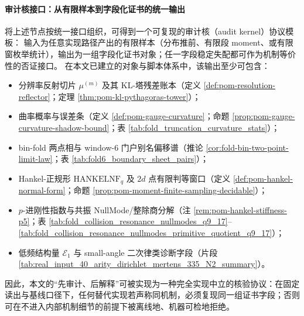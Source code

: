 \paragraph{审计核接口：从有限样本到字段化证书的统一输出}
将上述节点按统一接口组织，可得到一个可复现的审计核（audit kernel）协议模板：
输入为任意实现路径产出的有限样本（分布推前、有限段 moment、或有限窗枚举统计），输出为一组字段化证书对象；任一字段稳定失配都可作为机制等价性的否证接口。
在本文已建立的对象与脚本体系中，该输出至少可包含：
\begin{itemize}
  \item 分辨率反射切片 \(\mu^{(m)}\) 及其 KL-塔残差账本（定义 \ref{def:pom-resolution-reflector}；定理 \ref{thm:pom-kl-pythagoras-tower}）；
  \item 曲率概率与误差条（定义 \ref{def:pom-gauge-curvature}；命题 \ref{prop:pom-gauge-curvature-shadow-bound}；表 \ref{tab:fold_truncation_curvature_stats}）；
  \item bin-fold 两点相与 window-\(6\) 门户别名偏移谱（推论 \ref{cor:fold-bin-two-point-limit-law}；表 \ref{tab:fold6_boundary_sheet_pairs}）；
  \item Hankel-正规形 \(\mathrm{HANKELNF}_q\) 及 \(2d\) 点有限判等窗口（定义 \ref{def:pom-hankel-normal-form}；命题 \ref{prop:pom-moment-finite-sampling-decidable}）；
  \item \(p\)-进刚性指数与共振 NullMode/整除商分解（注 \ref{rem:pom-hankel-stiffness-p5}；表 \ref{tab:fold_collision_resonance_nullmodes_q9_17}--\ref{tab:fold_collision_resonance_nullmodes_primitive_quotient_q9_17}）；
  \item 低频结构量 \(\mathcal{E}_1\) 与 small-angle 二次律类诊断字段（片段 \ref{tab:real_input_40_arity_dirichlet_mertens_335_N2_summary}）。
\end{itemize}
因此，本文的“先审计、后解释”可被实现为一种完全实现中立的核验协议：在固定读出与基线口径下，任何替代实现若声称同机制，必须复现同一组证书字段；否则可在不进入内部机制细节的前提下被离线地、机器可检地拒绝。

